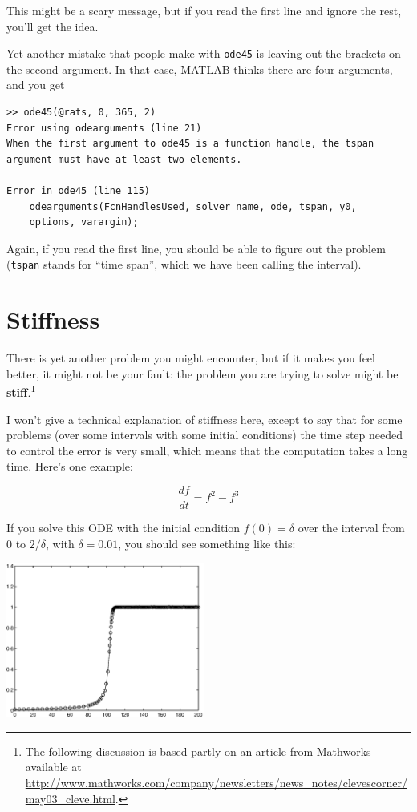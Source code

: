 \documentclass[
]{book}
\begin{document}
This might be a scary message, but if you read the first line
and ignore the rest, you'll get the idea.

Yet another mistake that people make with {\tt ode45} is leaving
out the brackets on the second argument.  In that case, MATLAB
thinks there are four arguments, and you get

\begin{verbatim}
>> ode45(@rats, 0, 365, 2)
Error using odearguments (line 21)
When the first argument to ode45 is a function handle, the tspan
argument must have at least two elements.

Error in ode45 (line 115)
    odearguments(FcnHandlesUsed, solver_name, ode, tspan, y0,
    options, varargin);
\end{verbatim}

Again, if you read the first line, you should be able to figure
out the problem ({\tt tspan} stands for ``time span'', which we
have been calling the interval).


\section{Stiffness}

There is yet another problem you might encounter, but if it makes you
feel better, it might not be your fault: the problem you are trying to
solve might be {\bf stiff}.\footnote{The following discussion is based
partly on an article from Mathworks available at
\url{http://www.mathworks.com/company/newsletters/news_notes/clevescorner/may03_cleve.html}.}

I won't give a technical explanation of stiffness here, except
to say that for some problems (over some intervals with some initial
conditions) the time step needed to control the error is very small,
which means that the computation takes a long time.  Here's one
example:

\begin{equation}
\frac{df}{dt} = f^2 - f^3
\end{equation}

If you solve this ODE with the initial condition $f(0) = \delta$ over
the interval from 0 to $2/\delta$, with $\delta = 0.01$, you should
see something like this:

\beforefig \centerline{\includegraphics[height=2in]{figs/stiff.eps}}
\end{document}
